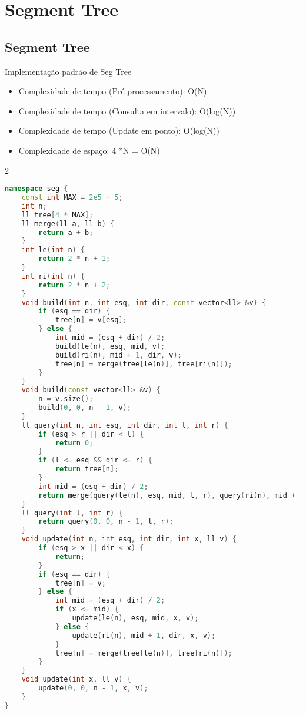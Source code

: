 \documentclass[11pt, a4paper, oneside]{book}
\begin{document}
\hfill

\section{Segment Tree}
\subsection{Segment Tree}
Implementação padrão de Seg Tree



\begin{itemize}
\item Complexidade de tempo (Pré-processamento): O(N)
\item Complexidade de tempo (Consulta em intervalo): O(log(N))
\item Complexidade de tempo (Update em ponto): O(log(N))
\item Complexidade de espaço: 4 *N = O(N)
\end{itemize}

\hfill

\begin{multicols}{2}
\begin{lstlisting}[language=C++]
namespace seg {
    const int MAX = 2e5 + 5;
    int n;
    ll tree[4 * MAX];
    ll merge(ll a, ll b) {
        return a + b;
    }
    int le(int n) {
        return 2 * n + 1;
    }
    int ri(int n) {
        return 2 * n + 2;
    }
    void build(int n, int esq, int dir, const vector<ll> &v) {
        if (esq == dir) {
            tree[n] = v[esq];
        } else {
            int mid = (esq + dir) / 2;
            build(le(n), esq, mid, v);
            build(ri(n), mid + 1, dir, v);
            tree[n] = merge(tree[le(n)], tree[ri(n)]);
        }
    }
    void build(const vector<ll> &v) {
        n = v.size();
        build(0, 0, n - 1, v);
    }
    ll query(int n, int esq, int dir, int l, int r) {
        if (esq > r || dir < l) {
            return 0;
        }
        if (l <= esq && dir <= r) {
            return tree[n];
        }
        int mid = (esq + dir) / 2;
        return merge(query(le(n), esq, mid, l, r), query(ri(n), mid + 1, dir, l, r));
    }
    ll query(int l, int r) {
        return query(0, 0, n - 1, l, r);
    }
    void update(int n, int esq, int dir, int x, ll v) {
        if (esq > x || dir < x) {
            return;
        }
        if (esq == dir) {
            tree[n] = v;
        } else {
            int mid = (esq + dir) / 2;
            if (x <= mid) {
                update(le(n), esq, mid, x, v);
            } else {
                update(ri(n), mid + 1, dir, x, v);
            }
            tree[n] = merge(tree[le(n)], tree[ri(n)]);
        }
    }
    void update(int x, ll v) {
        update(0, 0, n - 1, x, v);
    }
}
\end{lstlisting}
\end{multicols}
\end{document}
